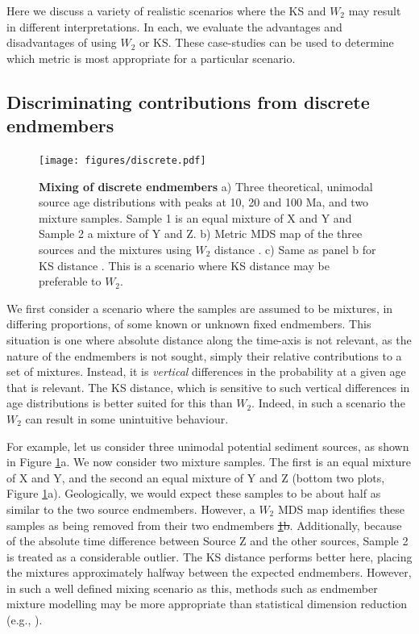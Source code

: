 \documentclass[gchron, manuscript]{copernicus}
\providecommand{\DIFaddtex}[1]{{\protect\color{blue}\uwave{#1}}} %
\providecommand{\DIFdeltex}[1]{{\protect\color{red}\sout{#1}}}                      %
\providecommand{\DIFaddbegin}{} %
\providecommand{\DIFaddend}{} %
\providecommand{\DIFdelbegin}{} %
\providecommand{\DIFdelend}{} %
\providecommand{\DIFaddFL}[1]{\DIFadd{#1}} %
\providecommand{\DIFaddbeginFL}{} %
\providecommand{\DIFaddendFL}{} %
\providecommand{\DIFadd}[1]{\texorpdfstring{\DIFaddtex{#1}}{#1}} %
\providecommand{\DIFdel}[1]{\texorpdfstring{\DIFdeltex{#1}}{}} %
\begin{document}
Here we discuss a variety of realistic scenarios where the KS and $W_2$ may result in different interpretations. In each, we evaluate the advantages and disadvantages of using $W_2$ or KS. These case-studies can be used to determine which metric is most appropriate for a particular scenario. 

\subsection{Discriminating contributions from discrete endmembers}

\begin{figure}
    \centering
    \texttt{[image: figures/discrete.pdf]}
    \caption{\textbf{Mixing of discrete endmembers} a) Three theoretical, unimodal source age distributions with peaks at 10, 20 and 100 Ma, and two mixture samples. Sample 1 is an equal mixture of X and Y and Sample 2 a mixture of Y and Z. b) Metric MDS map of the three sources and the mixtures using $W_2$ distance \DIFaddbeginFL \DIFaddFL{(stress = 0.05)}\DIFaddendFL . c) Same as panel b for KS distance \DIFaddbeginFL \DIFaddFL{(stress = 0.05)}\DIFaddendFL . This is a scenario where KS distance may be preferable to $W_2$.}
    \label{fig:discrete}
\end{figure}

We first consider a scenario where the samples are assumed to be mixtures, in differing proportions, of some known or unknown fixed endmembers. This situation is one where absolute distance along the time-axis is not relevant, as the nature of the endmembers is not sought, simply their relative contributions to a set of mixtures. Instead, it is \textit{vertical} differences in the probability at a given age that is relevant. The KS distance, which is sensitive to such vertical differences in age distributions is better suited for this than $W_2$. Indeed, in such a scenario the $W_2$ can result in some unintuitive behaviour. 

For example, let us consider three unimodal potential sediment sources, as shown in Figure \ref{fig:discrete}a. We now consider two mixture samples. The first is an equal mixture of X and Y, and the second an equal mixture of Y and Z (bottom two plots, Figure \ref{fig:discrete}a). Geologically, we would expect these samples to be about half as similar to the two source endmembers. However, a $W_2$ MDS map identifies these samples as being removed from their two endmembers \DIFdelbegin \DIFdel{\ref{fig:discrete}b}\DIFdelend \DIFaddbegin \DIFadd{(Figure \ref{fig:discrete}b)}\DIFaddend . Additionally, because of the absolute time difference between Source Z and the other sources, Sample 2 is treated as a considerable outlier. The KS distance performs better here, placing the mixtures approximately halfway between the expected endmembers. However, in such a well defined mixing scenario as this, methods such as endmember mixture modelling may be more appropriate than statistical dimension reduction (e.g., \citealt{weltje_end-member_1997,sharman_sediment_2017,dietze_grain-size_2019}).
\end{document}

